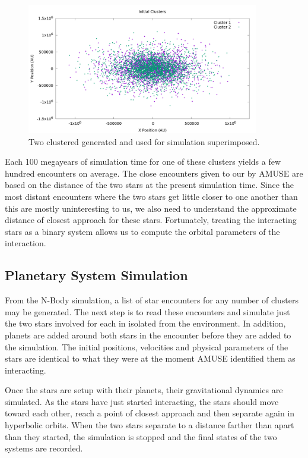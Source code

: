 \documentclass[12pt]{article}
\begin{document}
    \begin{figure}
        \centering
        \caption{Two clustered generated and used for simulation superimposed.}
        \includegraphics[width=4.0in]{cluster_superimposed.png}
    \end{figure}

    Each 100 megayears of simulation time for one of these clusters yields a
    few hundred encounters on average. The close encounters given to our by 
    AMUSE are based on the distance of the two stars at the present simulation time.
    Since the most distant encounters where the two stars get little closer to one
    another than this are mostly uninteresting to us, we also need to understand
    the approximate distance of closest approach for these stars. Fortunately, treating
    the interacting stars as a binary system allows us to compute the orbital parameters
    of the interaction. 



    

    \subsection{Planetary System Simulation}

    From the N-Body simulation, a list of star encounters for any number of 
    clusters may be generated. The next step is to read these encounters and
    simulate just the two stars involved for each in isolated from the 
    environment. In addition, planets are added around both stars in the
    encounter before they are added to the simulation. The initial positions,
    velocities and physical parameters of the stars are identical to what they
    were at the moment AMUSE identified them as interacting. 

    Once the stars are setup with their planets, their gravitational dynamics
    are simulated. As the stars have just started interacting, the stars should
    move toward each other, reach a point of closest approach and then separate again
    in hyperbolic orbits. When the two stars separate to a distance farther than
    apart than they started, the simulation is stopped and the final states of the two
    systems are recorded. 
\end{document}
